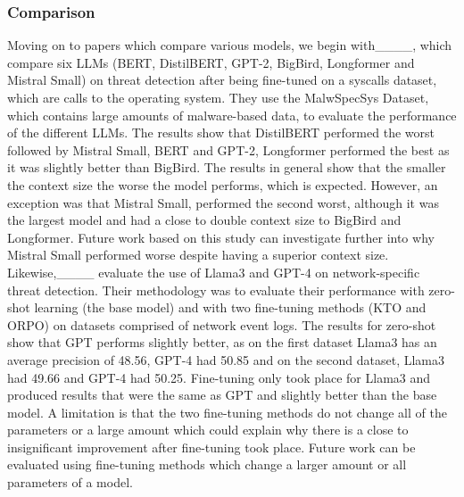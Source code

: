 \subsubsection{Comparison}
Moving on to papers which compare various models, we begin with____, which compare six LLMs (BERT, DistilBERT, GPT-2, BigBird, Longformer and Mistral Small) on threat detection after being fine-tuned on a syscalls dataset, which are calls to the operating system. They use the MalwSpecSys Dataset, which contains large amounts of malware-based data, to evaluate the performance of the different LLMs. The results show that DistilBERT performed the worst followed by Mistral Small, BERT and GPT-2, Longformer performed the best as it was slightly better than BigBird. The results in general show that the smaller the context size the worse the model performs, which is expected. However, an exception was that Mistral Small, performed the second worst, although it was the largest model and had a close to double context size to BigBird and Longformer. Future work based on this study can investigate further into why Mistral Small performed worse despite having a superior context size. Likewise,____ evaluate the use of Llama3 and GPT-4 on network-specific threat detection. Their methodology was to evaluate their performance with zero-shot learning (the base model) and with two fine-tuning methods (KTO and ORPO) on datasets comprised of network event logs. The results for zero-shot show that GPT performs slightly better, as on the first dataset Llama3 has an average precision of 48.56, GPT-4 had 50.85 and on the second dataset, Llama3 had 49.66 and GPT-4 had 50.25. Fine-tuning only took place for Llama3 and produced results that were the same as GPT and slightly better than the base model. A limitation is that the two fine-tuning methods do not change all of the parameters or a large amount which could explain why there is a close to insignificant improvement after fine-tuning took place. Future work can be evaluated using fine-tuning methods which change a larger amount or all parameters of a model.


